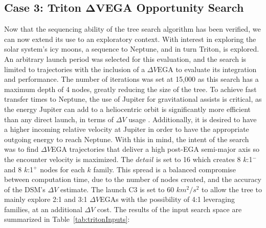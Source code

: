 \documentclass[letterpaper, paper,11pt]{AAS}	%
\begin{document}
\subsection*{Case 3: Triton $\boldsymbol{\Delta V}$EGA Opportunity Search}

Now that the sequencing ability of the tree search algorithm has been verified, we can now extend its use to an exploratory context. With interest in exploring the solar system's icy moons, a sequence to Neptune, and in turn Triton, is explored\cite{Hubbard2010}. An arbitrary launch period was selected for this evaluation, and the search is limited to trajectories with the inclusion of a $\Delta V$EGA to evaluate its integration and performance. The number of iterations was set at 15,000 as this search has a maximum depth of 4 nodes, greatly reducing the size of the tree. To achieve fast transfer times to Neptune, the use of Jupiter for gravitational assists is critical, as the energy Jupiter can add to a heliocentric orbit is significantly more efficient than any direct launch, in terms of $\Delta V$ usage \cite{Landau2010}. Additionally, it is desired to have a higher incoming relative velocity at Jupiter in order to have the appropriate outgoing energy to reach Neptune. With this in mind, the intent of the search was to find $\Delta V$EGA trajectories that deliver a high post-EGA semi-major axis so the encounter velocity is maximized. The $\textit{detail}$ is set to 16 which creates 8 $k$:1$^{-}$ and 8 $k$:1$^{+}$ nodes for each $k$ family. This spread is a balanced compromise between computation time, due to the number of nodes created, and the accuracy of the DSM's $\Delta V$ estimate. The launch C3 is set to 60 $km^2/s^2$ to allow the tree to mainly explore 2:1 and 3:1 $\Delta V$EGAs with the possibility of 4:1 leveraging families, at an additional $\Delta V$ cost. The results of the input search space are summarized in Table~\ref{tab:tritonInputs}:
\end{document}
